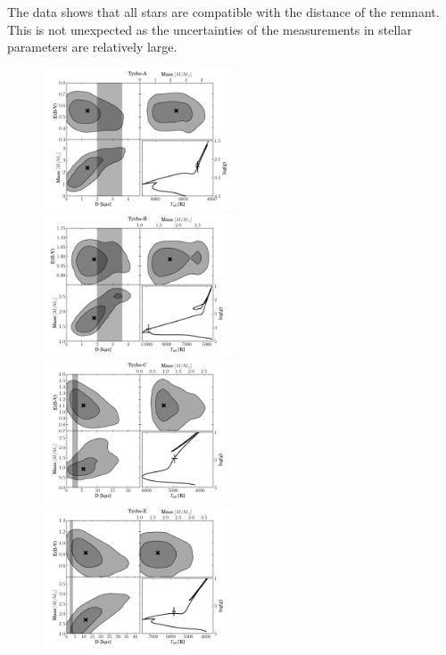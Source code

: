 The data shows that all stars are compatible with the distance of the remnant. This is not unexpected as the uncertainties of the measurements in stellar parameters are relatively large.




\begin{figure}[htbp] %
   \includegraphics[width=0.5\textwidth]{chapter3/plots/tycho-a-panel.pdf} 
   \includegraphics[width=0.5\textwidth]{chapter3/plots/tycho-b-panel.pdf} 
   \includegraphics[width=0.5\textwidth]{chapter3/plots/tycho-c-panel.pdf} 
   \includegraphics[width=0.5\textwidth]{chapter3/plots/tycho-e-panel.pdf} 

\end{figure}
